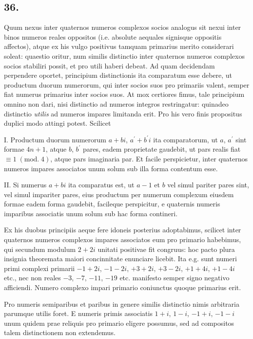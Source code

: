 \documentclass[twoside,12pt, showframe]{memoir}
\renewcommand{\pmod}[1]{\;(\textrm{mod.}\;#1)}
\begin{document}
\subsection*{36.}
 
Quum nexus inter quaternos numeros complexos socios analogus sit nexui inter binos numeros reales oppositos (i.e. absolute aequales signisque oppositis affectos), atque ex his vulgo positivus tamquam primarius merito considerari soleat:\clearpage\noindent%
quaestio oritur, num similis distinctio inter quaternos numeros complexos socios stabiliri possit, et pro utili haberi debeat. Ad quam decidendam perpendere oportet, principium distinctionis ita comparatum esse debere, ut productum duorum numerorum, qui inter socios suos pro primariis valent, semper fiat numerus primarius inter socios suos. At mox certiores fimus, tale principium omnino non dari, nisi distinctio ad numeros integros restringatur: quinadeo distinctio \textit{utilis} ad numeros impares limitanda erit. Pro his vero finis propositus duplici modo attingi potest. Scilicet
 
I. Productum duorum numerorum \(a+b i\), \(a^{\prime}+b^{\prime} i\) ita comparatorum, ut \(a\), \(a^{\prime}\) sint formae \(4 n+1\), atque \(b\), \(b^{\prime}\) pares, eadem proprietate gaudebit, ut pars realis fiat \(\equiv 1\pmod{4}\), atque pars imaginaria par. Et facile perspicietur, inter quaternos numeros impares associatos unum solum sub illa forma contentum esse.
 
II. Si numerus \(a+b i\) ita comparatus est, ut \(a-1\) et \(b\) vel simul pariter pares sint, vel simul impariter pares, eius productum per numerum complexum eiusdem formae eadem forma gaudebit, facileque perspicitur, e quaternis numeris imparibus associatis unum solum sub hac forma contineri.

Ex his duobus principiis aeque fere idoneis posterius adoptabimus, scilicet inter quaternos numeros complexos impares associatos eum pro primario habebimus, qui secundum modulum \(2+2 i\) unitati positivae fit congruus: hoc pacto plura insignia theoremata maiori concinnitate enunciare licebit. Ita e.g. sunt numeri primi complexi primarii \(-1+2 i\), \(-1-2 i\), \(+3+2 i\), \(+3-2 i\), \(+1+4 i\), \(+1-4 i\) etc., nec non reales \(-3\), \(-7\), \(-11\), \(-19\) etc. manifesto semper signo negativo afficiendi. Numero complexo impari primario coniunctus quoque primarius erit.
 
Pro numeris semiparibus et paribus in genere similis distinctio nimis arbitraria parumque utilis foret. E numeris primis associatis \(1+i\), \(1-i\), \(-1+i\), \(-1-i\) unum quidem prae reliquis pro primario eligere possumus, sed ad compositos talem distinctionem non extendemus.
\end{document}
